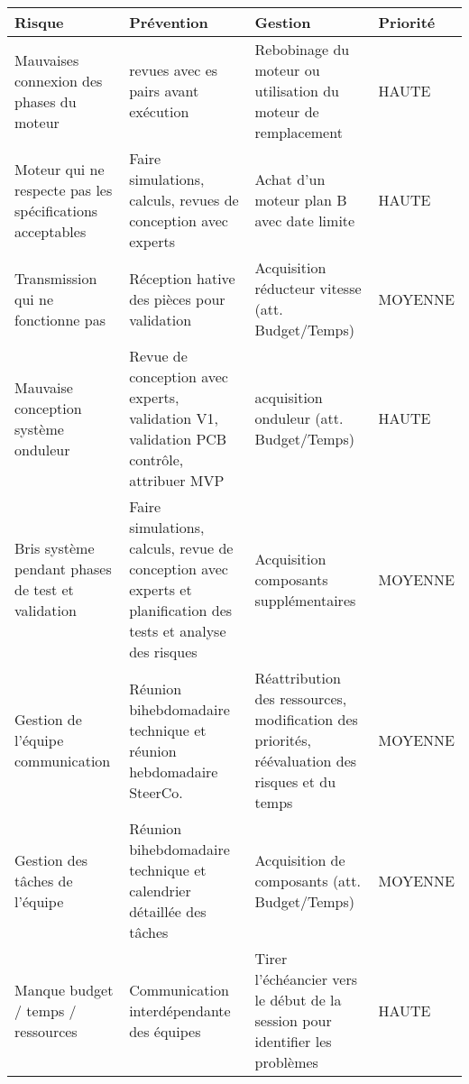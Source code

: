 \begin{tabularx}{\linewidth}{
    |>{\let\newline\\\hsize=0.40\hsize}X|%
    >{\hsize=0.25\hsize}X|%
    >{\hsize=0.25\hsize}X|%
    >{\centering\arraybackslash\hsize=0.1\hsize}X|%
  }
    \hline
    \textbf{Risque} & \textbf{Prévention} & \textbf{Gestion} & \textbf{Priorité}\\\hline
   Mauvaises connexion des phases du moteur & revues avec es pairs avant exécution & Rebobinage du moteur ou utilisation du moteur de remplacement & HAUTE\\\hline
    
    Moteur qui ne respecte pas les spécifications acceptables & Faire simulations, calculs, revues de conception avec experts & Achat d'un moteur plan B avec date limite & HAUTE\\\hline
    
    Transmission qui ne fonctionne pas & Réception hative des pièces pour validation & Acquisition réducteur vitesse (att. Budget/Temps) & MOYENNE\\\hline
    
    Mauvaise conception système onduleur & Revue de conception avec experts, validation V1, validation PCB contrôle, attribuer MVP & acquisition onduleur (att. Budget/Temps) & HAUTE\\\hline
    
    Bris système pendant phases de test et validation & Faire simulations, calculs, revue de conception avec experts et planification des tests et analyse des risques & Acquisition composants supplémentaires & MOYENNE\\\hline

    Gestion de l'équipe communication & Réunion bihebdomadaire technique et réunion hebdomadaire SteerCo. & Réattribution des ressources, modification des priorités, réévaluation des risques et du temps & MOYENNE\\\hline
    
    Gestion des tâches de l'équipe & Réunion bihebdomadaire technique et calendrier détaillée des tâches & Acquisition de composants (att. Budget/Temps) & MOYENNE\\\hline

    Manque budget / temps / ressources & Communication interdépendante des équipes & Tirer l'échéancier vers le début de la session pour identifier les problèmes & HAUTE\\\hline
    
  \end{tabularx}
  
